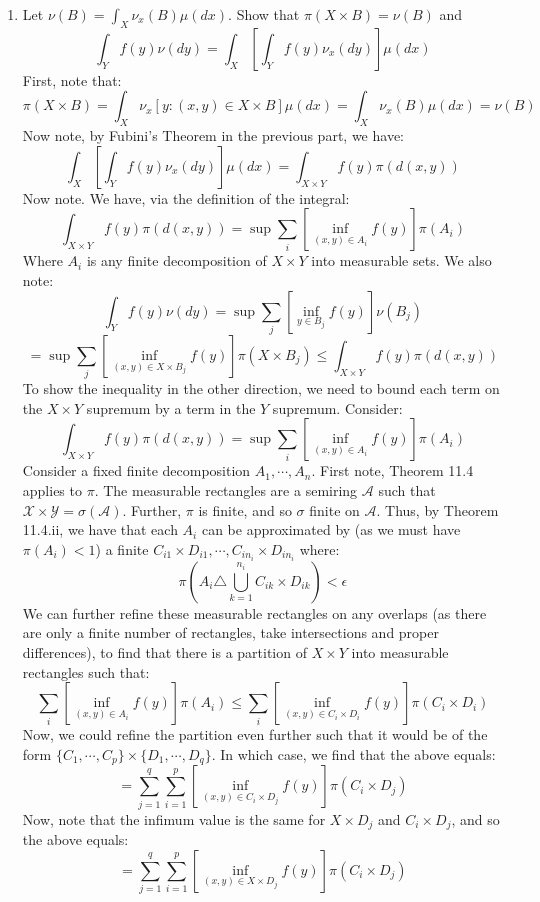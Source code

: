\documentclass[12pt,a4paper]{article}
\newcommand{\1}[1]{\mathbbm{1}\left\{ #1 \right\}}
\newcommand{\acal}{\mathcal{A}}
\newcommand{\xcal}{\mathcal{X}}
\newcommand{\ycal}{\mathcal{Y}}
\begin{document}
\begin{enumerate}
	\item Let $\nu(B) = \int_X \nu_x(B) \mu(dx)$. Show that $\pi(X \times B) = \nu(B)$ and
	$$
		\int_Y f(y) \nu(dy) = \int_X\left[\int_Y f(y) \nu_x(dy)\right]\mu(dx)
	$$
	First, note that:
	$$
		\pi(X \times B) = \int_X \nu_x\left[y : (x,y) \in X \times B\right] \mu(dx) =
		\int_X \nu_x(B) \mu(dx) = \nu(B)
	$$
	Now note, by Fubini's Theorem in the previous part, we have:
	$$
		\int_X\left[\int_Y f(y) \nu_x(dy)\right]\mu(dx) =
		\int_{X \times Y} f(y) \pi(d(x,y))
	$$
	Now note. We have, via the definition of the integral:
	$$
		\int_{X \times Y} f(y) \pi(d(x,y)) = \sup \sum_i \left[\inf_{(x,y) \in A_i} f(y)\right] \pi(A_i)
	$$
	Where $A_i$ is any finite decomposition of $X \times Y$ into measurable sets. We also note:
	$$
		\int_Y f(y) \nu(dy) =
		\sup \sum_j \left[\inf_{y \in B_j} f(y)\right] \nu(B_j)
	$$
	$$
		=
		\sup \sum_j \left[\inf_{(x,y) \in X \times B_j} f(y)\right] \pi(X \times B_j) \leq
		\int_{X \times Y} f(y) \pi(d(x,y))
	$$
	To show the inequality in the other direction, we need to bound each term on the $X \times Y$ supremum by a term in the $Y$ supremum. Consider:
	$$
		\int_{X \times Y} f(y) \pi(d(x,y)) = \sup \sum_i \left[\inf_{(x,y) \in A_i} f(y)\right] \pi(A_i)
	$$
	Consider a fixed finite decomposition $A_1, \cdots, A_n$. First note, Theorem 11.4 applies to $\pi$. The measurable rectangles are a semiring $\acal$ such that $\xcal \times \ycal = \sigma(\acal)$. Further, $\pi$ is finite, and so $\sigma$ finite on $\acal$. Thus, by Theorem 11.4.ii, we have that each $A_i$ can be approximated by (as we must have $\pi(A_i) < 1$) a finite $C_{i1} \times D_{i1}, \cdots, C_{in_i} \times D_{in_i}$ where:
	$$
		\pi\left(A_i \triangle \bigcup_{k=1}^{n_i} C_{ik} \times D_{ik}\right) < \epsilon
	$$
	We can further refine these measurable rectangles on any overlaps (as there are only a finite number of rectangles, take intersections and proper differences), to find that there is a partition of $X \times Y$ into measurable rectangles such that:
	$$
		\sum_i \left[\inf_{(x,y) \in A_i} f(y)\right] \pi(A_i) \leq
		\sum_i \left[\inf_{(x,y) \in C_i \times D_i} f(y)\right] \pi(C_i \times D_i)
	$$
	Now, we could refine the partition even further such that it would be of the form $\{C_1, \cdots, C_p\} \times \{D_1, \cdots, D_q\}$. In which case, we find that the above equals:
	$$
		=
		\sum_{j=1}^q \sum_{i=1}^p \left[\inf_{(x,y) \in C_i \times D_j} f(y)\right] \pi(C_i \times D_j)
	$$
	Now, note that the infimum value is the same for $X \times D_j$ and $C_i \times D_j$, and so the above equals:
	$$
		= \sum_{j=1}^q \sum_{i=1}^p \left[\inf_{(x,y) \in X \times D_j} f(y)\right] \pi(C_i \times D_j)
$$
\end{enumerate}
\end{document}
